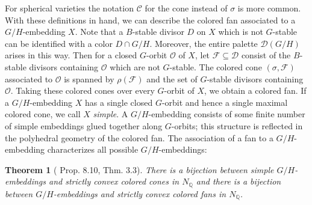 \documentclass[12pt,twoside,cd]{amsart}
\newtheorem{theorem}{Theorem}[section]
\theoremstyle{definition}
\begin{document}
For spherical varieties the notation $\mathcal{C}$ for the cone instead of $\sigma$ is more common.
With these definitions in hand, we can describe the colored fan associated to a $G/H$-embedding $X$.
Note that a $B$-stable divisor $D$ on $X$ which is not $G$-stable can be identified with a color $D \cap G/H$.
Moreover, the entire palette $\mathcal{D}(G/H)$ arises in this way.
Then for a closed $G$-orbit $\mathcal{O}$ of $X$, let $\mathcal{F} \subseteq \mathcal{D}$ consist of the $B$-stable divisors containing $\mathcal{O}$ which are not $G$-stable.
The colored cone $(\sigma,\mathcal{F})$ associated to $\mathcal{O}$ is spanned by $\rho(\mathcal{F})$ and the set of $G$-stable divisors containing $\mathcal{O}$.
Taking these colored cones over every $G$-orbit of $X$, we obtain a colored fan.
If a $G/H$-embedding $X$ has a single closed $G$-orbit and hence a single maximal colored cone, we call $X$ \emph{simple}.
A $G/H$-embedding consists of some finite number of simple embeddings glued together along $G$-orbits; this structure is reflected in the polyhedral geometry of the colored fan.
The association of a fan to a $G/H$-embedding characterizes all possible $G/H$-embeddings:
\begin{theorem}
[\cite{LV} Prop. 8.10, \cite{Kn} Thm. 3.3]
There is a bijection between simple $G/H$-embeddings and strictly convex colored cones in $N_\mathbb{Q}$ and there is a bijection between $G/H$-embeddings and strictly convex colored fans in $N_\mathbb{Q}$.
\end{theorem}
\end{document}
